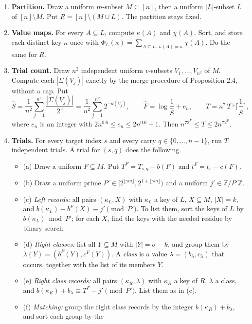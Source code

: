 \documentclass[10pt,a4paper]{article}
\begin{document}
\begin{enumerate}
\item \textbf{Partition.} Draw a uniform $m$-subset $M \subseteq [n]$, then a uniform $|L|$-subset $L$ of $[n]\setminus M$. Put
$R = [n]\setminus(M \cup L)$. The partition stays fixed.
\item \textbf{Value maps.} For every $A \subseteq L$, compute $\kappa(A)$ and $\chi(A)$. Sort, and store each distinct key
$\kappa$ once with $\Phi_L(\kappa) = \sum_{A\subseteq L:\ \kappa(A) = \kappa}\chi(A)$. Do the same for $R$.
\item \textbf{Trial count.} Draw $n^2$ independent uniform $v$-subsets $V_1, \dots, V_{n^2}$ of $M$. Compute each $|\Sigma(V_j)|$
exactly by the merge procedure of Proposition 2.4, without a cap. Put
\[\hat S = \frac1{n^2}\sum_{j=1}^{n^2}\frac{|\Sigma(V_j)|}{2^v} = \frac1{n^2}\sum_{j=1}^{n^2}2^{-d(V_j)},\qquad
\hat F = \log\frac1{\hat S} + e_n,\qquad T = n^7\,2^{e_n}\Big\lceil\frac1{\hat S}\Big\rceil,\]
where $e_n$ is an integer with $2n^{0.6} \le e_n \le 2n^{0.6} + 1$. Then $n^72^{\hat F} \le T \le 2n^72^{\hat F}$.
\item \textbf{Trials.} For every target index $s$ and every carry $q \in \{0, \dots, n-1\}$, run $T$ independent trials.
A trial for $(s, q)$ does the following.
\begin{itemize}
\item (a) Draw a uniform $F \subseteq M$. Put $T^F = T_{s,q} - b(F)$ and $t^F = t_s - c(F)$.
\item (b) Draw a uniform prime $P' \in [2^{\lfloor\gamma m\rfloor}, 2^{1+\lfloor\gamma m\rfloor})$ and a uniform
$j' \in \mathbb Z/P'\mathbb Z$.
\item (c) \emph{Left records:} all pairs $(\kappa_L, X)$ with $\kappa_L$ a key of $L$, $X \subseteq M$, $|X| = k$, and
$b(\kappa_L) + b^F(X) \equiv j' \pmod{P'}$. To list them, sort the keys of $L$ by $b(\kappa_L) \bmod P'$; for
each $X$, find the keys with the needed residue by binary search.
\item (d) \emph{Right classes:} list all $Y \subseteq M$ with $|Y| = \sigma - k$, and group them by
$\lambda(Y) = (b^F(Y), c^F(Y))$. A \emph{class} is a value $\lambda = (b_\lambda, c_\lambda)$ that occurs, together with
the list of its members $Y$.
\item (e) \emph{Right class records:} all pairs $(\kappa_R, \lambda)$ with $\kappa_R$ a key of $R$, $\lambda$ a class, and
$b(\kappa_R) + b_\lambda \equiv T^F - j' \pmod{P'}$. List them as in (c).
\item (f) \emph{Matching:} group the right class records by the integer $b(\kappa_R) + b_\lambda$, and sort each group by the

\end{itemize}
\end{enumerate}
\end{document}
